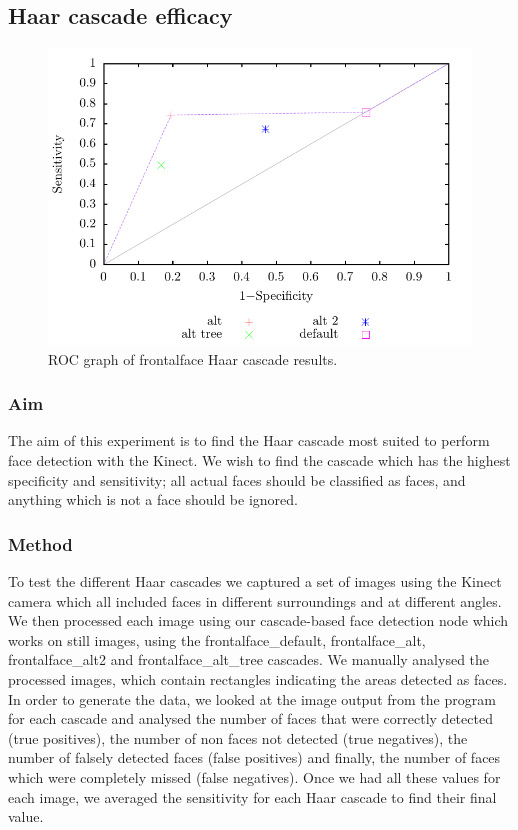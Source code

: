 \documentclass[conference]{IEEEtran}
\begin{document}
\subsection{Haar cascade efficacy}
\begin{figure}
  \includegraphics[width=\columnwidth]{haar_ROC}
  \caption{ROC graph of frontalface Haar cascade results.}
  \label{fig:haar}
\end{figure}
\subsubsection{Aim}
The aim of this experiment is to find the Haar cascade most suited to perform face detection with the Kinect. We wish to find the cascade which has the highest specificity and sensitivity; all actual faces should be classified as faces, and anything which is not a face should be ignored.
\subsubsection{Method}
To test the different Haar cascades we captured a set of images using the Kinect camera which all included faces in different surroundings and at different angles. We then processed each image using our cascade-based face detection node which works on still images, using the frontalface\_default, frontalface\_alt, frontalface\_alt2 and frontalface\_alt\_tree cascades. We manually analysed the processed images, which contain rectangles indicating the areas detected as faces. In order to generate the data, we looked at the image output from the program for each cascade and analysed the number of faces that were correctly detected (true positives), the number of non faces not detected (true negatives), the number of falsely detected faces (false positives) and finally, the number of faces which were completely missed (false negatives). Once we had all these values for each image, we averaged the sensitivity for each Haar cascade to find their final value.
\end{document}
